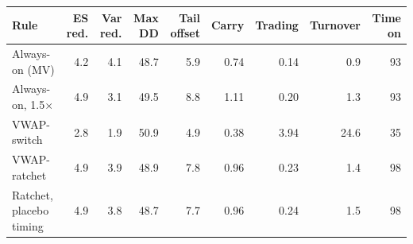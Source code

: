 \begin{tabular}{@{}lrrrrrrrr@{}}
\toprule
Rule & ES red. & Var red. & Max DD & Tail offset & Carry & Trading & Turnover & Time on \\
\midrule
Always-on (MV) & 4.2 & 4.1 & 48.7 & 5.9 & 0.74 & 0.14 & 0.9 & 93 \\
Always-on, 1.5$\times$ & 4.9 & 3.1 & 49.5 & 8.8 & 1.11 & 0.20 & 1.3 & 93 \\
VWAP-switch & 2.8 & 1.9 & 50.9 & 4.9 & 0.38 & 3.94 & 24.6 & 35 \\
VWAP-ratchet & 4.9 & 3.9 & 48.9 & 7.8 & 0.96 & 0.23 & 1.4 & 98 \\
Ratchet, placebo timing & 4.9 & 3.8 & 48.7 & 7.7 & 0.96 & 0.24 & 1.5 & 98 \\
\bottomrule
\end{tabular}
